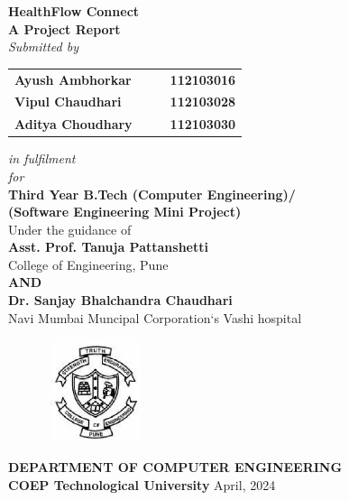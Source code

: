 \begin{titlepage}
\begin{center}
\LARGE{\bf{HealthFlow Connect\\}}
\vspace{10pt}
\Large{\bf{A Project Report\\}}	
\Large{\em{Submitted by\\}}
\begin{table}[htbp]
	\begin{center}
	\begin{tabular}{ l c c l }
	\Large\bf{Ayush Ambhorkar} & & & \Large\bf{112103016} \\[0.3cm] 
        \Large\bf{Vipul Chaudhari} & & & \Large\bf{112103028} \\[0.3cm] 
        \Large\bf{Aditya Choudhary} & & & \Large\bf{112103030} \\[0.3cm] 
	\end{tabular}
	\end{center}
	\end{table}
\Large{\em{in fulfilment \\ \vspace{1.5pt}for\\}}
\LARGE{\bf{Third Year B.Tech  (Computer Engineering)/\\ (Software Engineering Mini Project)\\}}%
\vspace{20pt}
\Large{Under the guidance of\\ }
\Large{\bf{Asst. Prof. Tanuja Pattanshetti }\\}
\Large{College of Engineering, Pune\\}
\vspace{10pt}
\large{\bf{AND}\\}	%
\vspace{10pt}
\Large{\bf{Dr. Sanjay Bhalchandra Chaudhari}\\}
\Large{Navi Mumbai Muncipal Corporation`s Vashi hospital\\}
\vspace{10pt}
\begin{figure}[h]
\centering
\includegraphics[width=3cm,height=3cm]{coeplogo.eps}
\end{figure}
\Large{\bf{DEPARTMENT OF COMPUTER ENGINEERING \\ 
COEP Technological University}}
\vfill
\large{April, 2024}
\end{center}
\end{titlepage}
